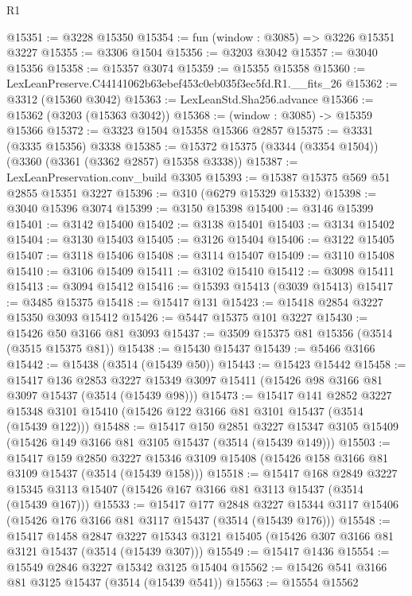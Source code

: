 \begin{lexlean}{R1}
\begin{coremodule}
@15351 := @3228 @15350
@15354 := fun (window : @3085) => @3226 @15351 @3227
@15355 := @3306 @1504
@15356 := @3203 @3042
@15357 := @3040 @15356
@15358 := @15357 @3074
@15359 := @15355 @15358
@15360 := LexLeanPreserve.C44141062b63ebef453c0eb035f3ec5fd.R1.__fits_26
@15362 := @3312 (@15360 @3042)
@15363 := LexLeanStd.Sha256.advance
@15366 := @15362 (@3203 (@15363 @3042))
@15368 := (window : @3085) -> @15359 @15366
@15372 := @3323 @1504 @15358 @15366 @2857
@15375 := @3331 (@3335 @15356) @3338
@15385 := @15372 @15375 (@3344 (@3354 @1504)) (@3360 (@3361 (@3362 @2857) @15358 @3338))
@15387 := LexLeanPreservation.conv_build @3305
@15393 := @15387 @15375 @569 @51 @2855 @15351 @3227
@15396 := @310 (@6279 @15329 @15332)
@15398 := @3040 @15396 @3074
@15399 := @3150 @15398
@15400 := @3146 @15399
@15401 := @3142 @15400
@15402 := @3138 @15401
@15403 := @3134 @15402
@15404 := @3130 @15403
@15405 := @3126 @15404
@15406 := @3122 @15405
@15407 := @3118 @15406
@15408 := @3114 @15407
@15409 := @3110 @15408
@15410 := @3106 @15409
@15411 := @3102 @15410
@15412 := @3098 @15411
@15413 := @3094 @15412
@15416 := @15393 @15413 (@3039 @15413)
@15417 := @3485 @15375
@15418 := @15417 @131
@15423 := @15418 @2854 @3227 @15350 @3093 @15412
@15426 := @5447 @15375 @101 @3227
@15430 := @15426 @50 @3166 @81 @3093
@15437 := @3509 @15375 @81 @15356 (@3514 (@3515 @15375 @81))
@15438 := @15430 @15437
@15439 := @5466 @3166
@15442 := @15438 (@3514 (@15439 @50))
@15443 := @15423 @15442
@15458 := @15417
    @136
    @2853
    @3227
    @15349
    @3097
    @15411
    (@15426 @98 @3166 @81 @3097 @15437 (@3514 (@15439 @98)))
@15473 := @15417
    @141
    @2852
    @3227
    @15348
    @3101
    @15410
    (@15426 @122 @3166 @81 @3101 @15437 (@3514 (@15439 @122)))
@15488 := @15417
    @150
    @2851
    @3227
    @15347
    @3105
    @15409
    (@15426 @149 @3166 @81 @3105 @15437 (@3514 (@15439 @149)))
@15503 := @15417
    @159
    @2850
    @3227
    @15346
    @3109
    @15408
    (@15426 @158 @3166 @81 @3109 @15437 (@3514 (@15439 @158)))
@15518 := @15417
    @168
    @2849
    @3227
    @15345
    @3113
    @15407
    (@15426 @167 @3166 @81 @3113 @15437 (@3514 (@15439 @167)))
@15533 := @15417
    @177
    @2848
    @3227
    @15344
    @3117
    @15406
    (@15426 @176 @3166 @81 @3117 @15437 (@3514 (@15439 @176)))
@15548 := @15417
    @1458
    @2847
    @3227
    @15343
    @3121
    @15405
    (@15426 @307 @3166 @81 @3121 @15437 (@3514 (@15439 @307)))
@15549 := @15417 @1436
@15554 := @15549 @2846 @3227 @15342 @3125 @15404
@15562 := @15426 @541 @3166 @81 @3125 @15437 (@3514 (@15439 @541))
@15563 := @15554 @15562

\end{coremodule}
\end{lexlean}
